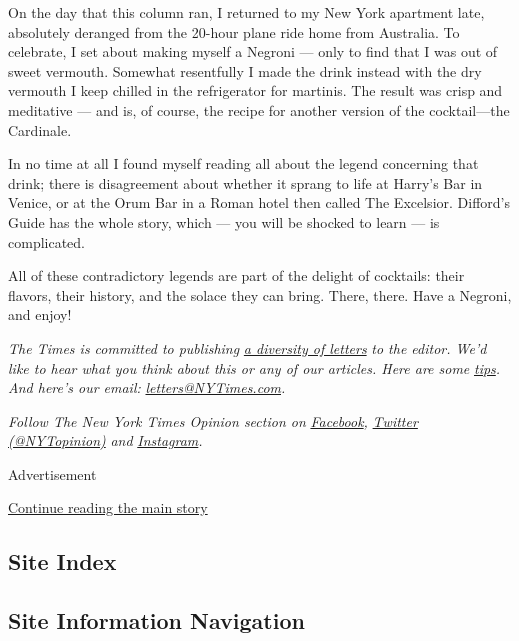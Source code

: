 On the day that this column ran, I returned to my New York apartment
late, absolutely deranged from the 20-hour plane ride home from
Australia. To celebrate, I set about making myself a Negroni --- only to
find that I was out of sweet vermouth. Somewhat resentfully I made the
drink instead with the dry vermouth I keep chilled in the refrigerator
for martinis. The result was crisp and meditative --- and is, of course,
the recipe for another version of the cocktail---the Cardinale.

In no time at all I found myself reading all about the legend concerning
that drink; there is disagreement about whether it sprang to life at
Harry's Bar in Venice, or at the Orum Bar in a Roman hotel then called
The Excelsior. Difford's Guide has the whole story, which --- you will
be shocked to learn --- is complicated.

All of these contradictory legends are part of the delight of cocktails:
their flavors, their history, and the solace they can bring. There,
there. Have a Negroni, and enjoy!

\emph{The Times is committed to publishing}
\href{https://www.nytimes3xbfgragh.onion/2019/01/31/opinion/letters/letters-to-editor-new-york-times-women.html}{\emph{a
diversity of letters}} \emph{to the editor. We'd like to hear what you
think about this or any of our articles. Here are some}
\href{https://help.nytimes3xbfgragh.onion/hc/en-us/articles/115014925288-How-to-submit-a-letter-to-the-editor}{\emph{tips}}\emph{.
And here's our email:}
\href{mailto:letters@NYTimes.com}{\emph{letters@NYTimes.com}}\emph{.}

\emph{Follow The New York Times Opinion section on}
\href{https://www.facebookcorewwwi.onion/nytopinion}{\emph{Facebook}}\emph{,}
\href{http://twitter.com/NYTOpinion}{\emph{Twitter (@NYTopinion)}}
\emph{and}
\href{https://www.instagram.com/nytopinion/}{\emph{Instagram}}\emph{.}

Advertisement

\protect\hyperlink{after-bottom}{Continue reading the main story}

\hypertarget{site-index}{%
\subsection{Site Index}\label{site-index}}

\hypertarget{site-information-navigation}{%
\subsection{Site Information
Navigation}\label{site-information-navigation}}

